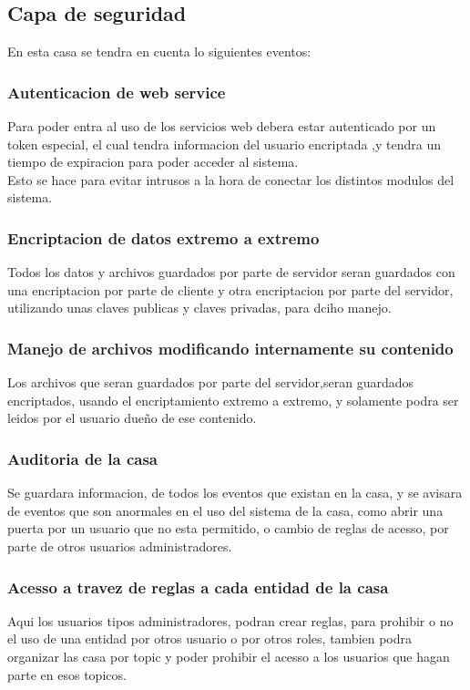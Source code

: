 \subsection{Capa de seguridad}
En esta casa se tendra en cuenta lo siguientes eventos:
\subsubsection{Autenticacion de web service}
Para poder entra al uso de los servicios web debera estar autenticado por un token especial, el cual tendra informacion del usuario encriptada ,y tendra un tiempo de expiracion para poder acceder al sistema.\\
Esto se hace para evitar intrusos a la hora de conectar los distintos modulos del sistema.
\subsubsection{Encriptacion de datos extremo a extremo}
Todos los datos y archivos guardados por parte de servidor seran guardados con una encriptacion por parte de cliente y otra encriptacion por parte del servidor, utilizando unas claves publicas y claves privadas, para dciho manejo.
\subsubsection{Manejo de archivos modificando internamente su contenido}
Los archivos que seran guardados por parte del servidor,seran guardados encriptados, usando el encriptamiento extremo a extremo, y solamente podra ser leidos por el usuario dueño de ese contenido.
\subsubsection{Auditoria de la casa}
Se guardara informacion, de todos los eventos que existan en la casa, y se avisara de eventos que son anormales en el uso del sistema de la casa, como abrir una puerta por un usuario que no esta permitido, o cambio de reglas de acesso, por parte de otros usuarios administradores.
\subsubsection{Acesso a travez de reglas a cada entidad de la casa}
Aqui los usuarios tipos administradores, podran crear reglas, para prohibir o no el uso de una entidad por otros usuario o por otros roles, tambien podra organizar las casa por topic y poder prohibir el acesso a los usuarios que hagan parte en esos topicos.
